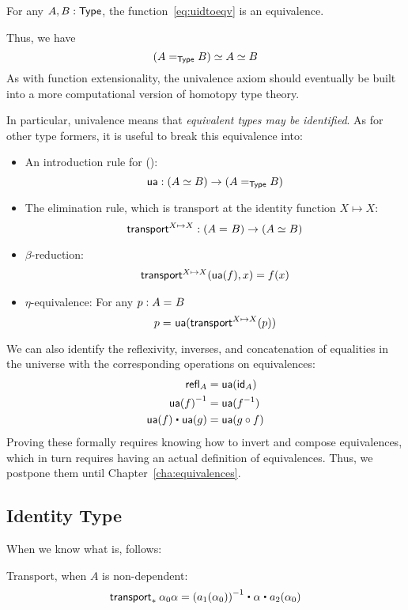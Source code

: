 \begin{axiom}[Univalence]
  For any $A,B:\type$, the function~\eqref{eq:uidtoeqv} is an equivalence.
\end{axiom}

Thus, we have
\[
\eqv{(\id[\type]{A}{B})}{\eqv A B}
\]
As with function extensionality, the univalence axiom should eventually be built into a more computational version of homotopy type theory.

In particular, univalence means that \emph{equivalent types may be identified}.
As for other type formers, it is useful to break this equivalence into:

\begin{itemize}
\item An introduction rule for {()}:
  \[
  \ua : ({\eqv A B}) \to (\id[\type]{A}{B})
  \]
\item The elimination rule, which is transport at the identity function $X\mapsto X$:
  \[
  \transfibf{X \mapsto X} : (\id{A}{B}) \to (\eqv A B)
  \]
\item $\beta$-reduction: 
  \[
  \begin{array}{l}
  \transfib{X \mapsto X}{\ua(f)}{x} = f(x)
  \end{array}
  \]
\item $\eta$-equivalence: For any $p : \id A B$
  \[
  \id{p}{\ua(\transfibf{X \mapsto X}(p))}
  \]
\end{itemize}

We can also identify the reflexivity, inverses, and concatenation of equalities in the universe with the corresponding operations on equivalences:
\begin{align*}
  \refl{A} &= \ua(\idfunc[A]) \\
  \opp{\ua(f)} &= \ua(f^{-1}) \\ 
  \ua(f) \ct \ua(g) &= \ua(g\circ f)
\end{align*}
Proving these formally requires knowing how to invert and compose equivalences, which in turn requires having an actual definition of equivalences.
Thus, we postpone them until Chapter~\ref{cha:equivalences}.


\subsection{Identity Type}
\label{sec:compute-paths}

When we know what \id[A]{}{} is, \id[ {\id[A]{}{}} ]{}{} follows:

Transport, when $A$ is non-dependent:
\[
\begin{array}{l}
\transport{x_0:A_0 \mapsto \id[A] {a_1(x_0)}{a_2(x_0)}} {\alpha_0}{\alpha} = 
\opp{(\map{a_1}{\alpha_0})} \ct \alpha \ct \map{a_2}{\alpha_0}
\end{array}
\]

